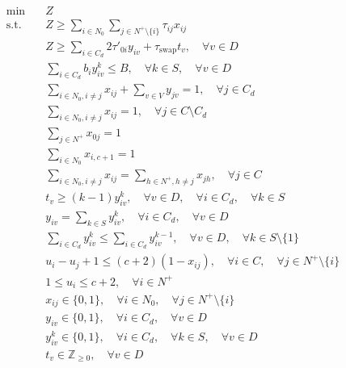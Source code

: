 \documentclass[3p, authoryear, 11pt]{elsarticle}
\begin{document}
\begin{align}
\text{min} \quad 
& Z 
\label{eq:milp_obj} \\
\text{s.t.} \quad 
& Z \geq 
\sum_{i \in N_0} 
\sum_{j \in N^+ \setminus \{i\}} 
\tau_{ij} x_{ij} 
\label{eq:milp_truck_makespan} \\
& Z \geq 
\sum_{i \in C_d} 2\tau'_{0i} y_{iv} 
+ \tau_{\mathrm{swap}}t_v, 
\quad \forall v \in D 
\label{eq:milp_drone_makespan} \\
& \sum_{i \in C_d} b_i y^k_{iv} \leq B, 
\quad \forall k \in S, \quad \forall v \in D 
\label{eq:milp_resource_limit} \\
& \sum_{i\in N_0, i \neq j} x_{ij} 
+ \sum_{v \in V} y_{jv} = 1, 
\quad \forall j \in C_d
\label{eq:milp_visit_drone_eligible} \\
& \sum_{i\in N_0, i \neq j} x_{ij} = 1, 
\quad \forall j \in C \setminus C_d
\label{eq:milp_visit_truck_only} \\
& \sum_{j \in N^+} x_{0j} = 1 
\label{eq:milp_truck_start} \\
& \sum_{i \in N_0} x_{i,c+1} = 1 
\label{eq:milp_truck_end} \\
& \sum_{i \in N_0, i \neq j} x_{ij} 
= 
\sum_{h \in N^+, h \neq j} x_{jh}, 
\quad \forall j \in C 
\label{eq:milp_flow} \\
& t_v \geq (k - 1)y^k_{iv},
\quad \forall v \in D, \quad \forall i \in C_d, \quad \forall k \in S
\label{eq:milp_sbc_tv}
\\
& y_{iv} = 
\sum_{k \in S} y^k_{iv}, 
\quad \forall i \in C_d, \quad \forall v \in D 
\label{eq:milp_y_link} \\
& \sum_{i \in C_d} y^k_{iv} 
\leq 
\sum_{i \in C_d} y^{k-1}_{iv}, 
\quad \forall v \in D, \quad \forall k \in S \setminus \{1\} 
\label{eq:milp_session_order} \\
& u_i - u_j + 1 
\leq 
(c+2)(1 - x_{ij}), 
\quad \forall i \in C, \quad \forall j \in N^+ \setminus \{i\} 
\label{eq:milp_mtz_1} \\
& 1 \leq u_i \leq c+2, 
\quad \forall i \in N^+ 
\label{eq:milp_mtz_2} \\
& x_{ij} \in \{0,1\}, 
\quad \forall i \in N_0, \quad \forall j \in N^+ \setminus \{i\} 
\label{eq:milp_x_domain} \\
& y_{iv} \in \{0,1\}, 
\quad \forall i \in C_d, \quad \forall v \in D 
\label{eq:milp_y_domain} \\
& y^k_{iv} \in \{0,1\}, 
\quad \forall i \in C_d, \quad \forall k \in S, \quad \forall v \in D 
\label{eq:milp_yk_domain}\\
& t_v \in \mathbb{Z}_{\geq 0},
\quad \forall v \in D
\label{eq:milp_t_domain}
\end{align}
\end{document}
